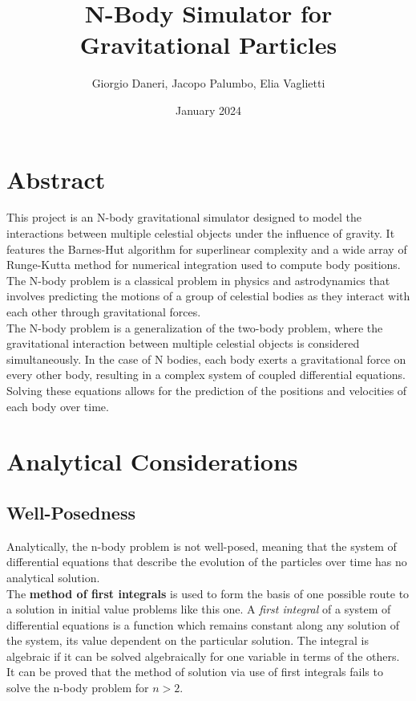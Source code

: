 \documentclass{article}
\title{N-Body Simulator for Gravitational Particles}
\author{Giorgio Daneri, Jacopo Palumbo, Elia Vaglietti}
\date{January 2024}
\begin{document}
\maketitle


\section{Abstract}
This project is an N-body gravitational simulator designed to model the interactions between multiple celestial objects under the influence of gravity. It features the Barnes-Hut algorithm for superlinear complexity and a wide array of Runge-Kutta method for numerical integration used to compute body positions. The N-body problem is a classical problem in physics and astrodynamics that involves predicting the motions of a group of celestial bodies as they interact with each other through gravitational forces. \\
The N-body problem is a generalization of the two-body problem, where the gravitational interaction between multiple celestial objects is considered simultaneously. In the case of N bodies, each body exerts a gravitational force on every other body, resulting in a complex system of coupled differential equations. Solving these equations allows for the prediction of the positions and velocities of each body over time.

\section{Analytical Considerations}

\subsection{Well-Posedness}

Analytically, the n-body problem is not well-posed, meaning that the system of differential equations that describe the evolution of the particles over time has no analytical solution. \\
The \textbf{method of first integrals} is used to form the basis of one possible route to a solution in initial value problems like this one. A \textit{first integral} of a system of differential equations is a function which remains constant along any solution of the system, its value dependent on the particular solution. The integral is algebraic if it can be solved algebraically for one variable in terms of the others.
It can be proved that the method of solution via use of first integrals fails to solve the n-body problem for $n > 2$. \cite{senchyna2013less} \\
\end{document}
